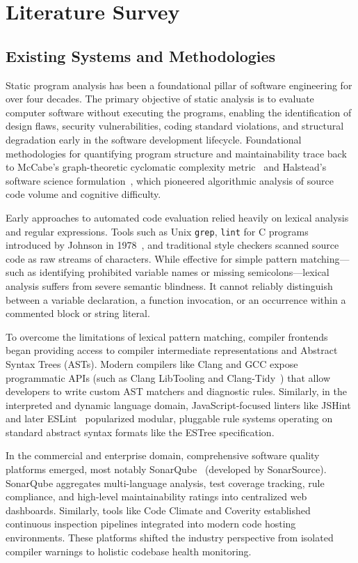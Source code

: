 \chapter{Literature Survey}

\section{Existing Systems and Methodologies}
Static program analysis has been a foundational pillar of software engineering for over four decades. The primary objective of static analysis is to evaluate computer software without executing the programs, enabling the identification of design flaws, security vulnerabilities, coding standard violations, and structural degradation early in the software development lifecycle. Foundational methodologies for quantifying program structure and maintainability trace back to McCabe's graph-theoretic cyclomatic complexity metric~\cite{mccabe1976} and Halstead's software science formulation~\cite{halstead1977}, which pioneered algorithmic analysis of source code volume and cognitive difficulty.

Early approaches to automated code evaluation relied heavily on lexical analysis and regular expressions. Tools such as Unix \texttt{grep}, \texttt{lint} for C programs introduced by Johnson in 1978~\cite{johnson1978}, and traditional style checkers scanned source code as raw streams of characters. While effective for simple pattern matching—such as identifying prohibited variable names or missing semicolons—lexical analysis suffers from severe semantic blindness. It cannot reliably distinguish between a variable declaration, a function invocation, or an occurrence within a commented block or string literal.

To overcome the limitations of lexical pattern matching, compiler frontends began providing access to compiler intermediate representations and Abstract Syntax Trees (ASTs). Modern compilers like Clang and GCC expose programmatic APIs (such as Clang LibTooling and Clang-Tidy~\cite{clangtidy}) that allow developers to write custom AST matchers and diagnostic rules. Similarly, in the interpreted and dynamic language domain, JavaScript-focused linters like JSHint and later ESLint~\cite{eslint} popularized modular, pluggable rule systems operating on standard abstract syntax formats like the ESTree specification.

In the commercial and enterprise domain, comprehensive software quality platforms emerged, most notably SonarQube~\cite{sonarqube} (developed by SonarSource). SonarQube aggregates multi-language analysis, test coverage tracking, rule compliance, and high-level maintainability ratings into centralized web dashboards. Similarly, tools like Code Climate and Coverity established continuous inspection pipelines integrated into modern code hosting environments. These platforms shifted the industry perspective from isolated compiler warnings to holistic codebase health monitoring.

